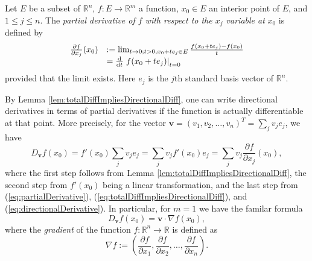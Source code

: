 \begin{defn}
  \label{def:partialDerivative}
  Let $E$ be a subset of $\mathbb{R}^n$,
  $f: E\rightarrow \mathbb{R}^m$ a function,
  $x_0\in E$ an interior point of $E$,
  and $1\le j \le n$.
  The \emph{partial derivative of $f$ with respect to the $x_j$
    variable at} $x_0$ is defined by
  \begin{equation}
    \label{eq:partialDerivative}
    \begin{array}{ll}
    \frac{\partial f}{\partial x_j}(x_0) &:=
    \lim_{t\rightarrow 0; t>0, x_0+te_j\in E} \frac{f(x_0+te_j) -
      f(x_0)}{t} \\
      &= \frac{\mathrm{d}}{\mathrm{d} t} \left. f(x_0+te_j)\right|_{t=0}
    \end{array}
  \end{equation}
  provided that the limit exists.
  Here $e_j$ is the $j$th standard basis vector of $\mathbb{R}^n$.
\end{defn}

\begin{rem}
  By Lemma \ref{lem:totalDiffImpliesDirectionalDiff},
  one can write directional derivatives
  in terms of partial derivatives
  if the function is actually differentiable at that point.
  More precisely, for the vector
  $\mathbf{v}=(v_1, v_2, \ldots, v_n)^T=\sum_j v_j e_j$,
  we have
  \begin{displaymath}
    D_{\mathbf{v}} f(x_0) = f'(x_0) \sum_j v_j e_j = \sum_j v_j
    f'(x_0) e_j = \sum_j v_j \frac{\partial f}{\partial x_j}(x_0), 
  \end{displaymath}
  where the first step follows from Lemma
  \ref{lem:totalDiffImpliesDirectionalDiff},
  the second step from $f'(x_0)$ being a linear transformation,
  and the last step from (\ref{eq:partialDerivative}),
  (\ref{eq:totalDiffImpliesDirectionalDiff}), and
  (\ref{eq:directionalDerivative}).
  In particular, for $m=1$ we have the familar formula
  \begin{displaymath}
    D_{\mathbf{v}} f(x_0) = \mathbf{v}\cdot \nabla f(x_0),
  \end{displaymath}
  where the \emph{gradient} of the function
  $f: \mathbb{R}^n\rightarrow \mathbb{R}$ is defined as
  \begin{displaymath}
    \nabla f := \left(
      \frac{\partial f}{\partial x_1}, 
      \frac{\partial f}{\partial x_2}, 
      \ldots,
      \frac{\partial f}{\partial x_n}
      \right).
  \end{displaymath}
\end{rem}

